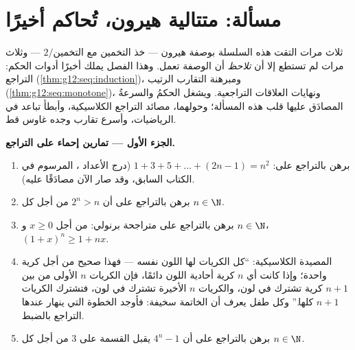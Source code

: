 \section{مسألة: متتالية هيرون، تُحاكم أخيرًا}

\begin{problem}
\label{pb:g12:seq:1}
ثلاث مرات التقت هذه السلسلة بوصفة هيرون --- خذ 
التخمين مع $2/\text{التخمين}$ --- وثلاث مرات لم تستطع إلا أن
\emph{تلاحظ} أن الوصفة تعمل. وهذا الفصل يملك أخيرًا
أدوات الحكم: التراجع
(\cref{thm:g12:seq:induction})، ومبرهنة التقارب الرتيب
(\cref{thm:g12:seq:monotone})، ونهايات العلاقات التراجعية. ويشغل
الحكمُ والسرعةُ المصادَق عليها قلب هذه
المسألة؛ وحولهما، مصائد التراجع الكلاسيكية، وأبطأ
تباعد في الرياضيات، وأسرع تقارب وجده غاوس
قط.

\medskip
\noindent\textbf{الجزء الأول --- تمارين إحماء على التراجع.}
\begin{enumerate}
  \item برهن بالتراجع على:
        $1 + 3 + 5 + \dots + (2n - 1) = n^2$ (درج
        الأعداد ، المرسوم في الكتاب السابق، وقد صار
        الآن مصادَقًا عليه).
  \item برهن بالتراجع على أن $2^n > n$ من أجل كل
        $n \in \N$.
  \item برهن بالتراجع على متراجحة برنولي: من أجل
        $x \geq 0$ و $n \in \N$،
        $(1 + x)^n \geq 1 + nx$.
  \item المصيدة الكلاسيكية: ``كل الكريات لها اللون نفسه ---
        فهذا صحيح من أجل كرية واحدة؛ وإذا كانت أي $n$ كرية أحادية
        اللون دائمًا، فإن الكريات $n$ الأولى من بين $n + 1$ كرية
        تشترك في لون، والكريات $n$ الأخيرة تشترك في لون، فتشترك
        الكريات $n + 1$ كلها.'' وكل طفل يعرف أن الخاتمة
        سخيفة: فأوجد الخطوة التي ينهار عندها التراجع بالضبط.
  \item برهن بالتراجع على أن $4^n - 1$ يقبل القسمة على $3$
        من أجل كل $n \in \N$.
\end{enumerate}


\end{problem}
